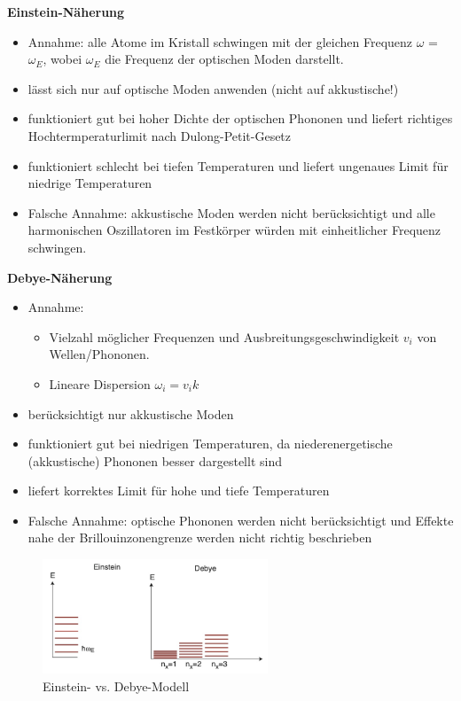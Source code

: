 \label{q:39}

\label{q:40}
\textbf{Einstein-Näherung} 
\begin{itemize}
    \item Annahme: alle Atome im Kristall schwingen mit der gleichen Frequenz $\omega$ = $\omega_E$, wobei $\omega_E$ die Frequenz der optischen Moden darstellt. 
    \item lässt sich nur auf optische Moden anwenden (nicht auf akkustische!)
    \item funktioniert gut bei hoher Dichte der optischen Phononen und liefert richtiges 
    Hochtermperaturlimit nach Dulong-Petit-Gesetz
    \item funktioniert schlecht bei tiefen Temperaturen und liefert ungenaues Limit für niedrige Temperaturen
    \item Falsche Annahme: akkustische Moden werden nicht berücksichtigt und alle harmonischen Oszillatoren im Festkörper würden mit einheitlicher Frequenz schwingen.
\end{itemize}

\textbf{Debye-Näherung} 
\begin{itemize}
    \item Annahme: 
        \begin{itemize}
            \item Vielzahl möglicher Frequenzen und Ausbreitungsgeschwindigkeit $v_i$ von Wellen/Phononen. 
            \item Lineare Dispersion $\omega_i=v_ik$ 
        \end{itemize}
    \item berücksichtigt nur akkustische Moden
    \item funktioniert gut bei niedrigen Temperaturen, da niederenergetische (akkustische) Phononen besser dargestellt sind 
    \item liefert korrektes Limit für hohe und tiefe Temperaturen
    \item Falsche Annahme: optische Phononen werden nicht berücksichtigt und Effekte nahe der Brillouinzonengrenze werden nicht richtig beschrieben
\end{itemize}

\begin{figure}[H]
 \centering
 \includegraphics[width=0.6\textwidth]{resources/15-06-2015/Einstein_Debye.jpeg}
 \caption{Einstein- vs. Debye-Modell}
\end{figure}
\newpage